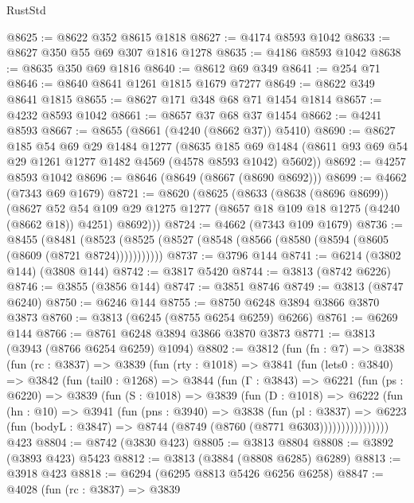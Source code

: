 \begin{lexlean}{RustStd}
\begin{coremodule}
{\begin{coremodule}
{{{{{{{{{{{{{{{{{{{{{{{{{{{{{{{{{{{@8625 := @8622 @352 @8615 @1818
@8627 := @4174 @8593 @1042
@8633 := @8627 @350 @55 @69 @307 @1816 @1278
@8635 := @4186 @8593 @1042
@8638 := @8635 @350 @69 @1816
@8640 := @8612 @69 @349
@8641 := @254 @71
@8646 := @8640 @8641 @1261 @1815 @1679 @7277
@8649 := @8622 @349 @8641 @1815
@8655 := @8627 @171 @348 @68 @71 @1454 @1814
@8657 := @4232 @8593 @1042
@8661 := @8657 @37 @68 @37 @1454
@8662 := @4241 @8593
@8667 := @8655 (@8661 (@4240 (@8662 @37)) @5410)
@8690 := @8627
    @185
    @54
    @69
    @29
    @1484
    @1277
    (@8635 @185 @69 @1484 (@8611 @93 @69 @54 @29 @1261 @1277 @1482 @4569 (@4578 @8593 @1042) @5602))
@8692 := @4257 @8593 @1042
@8696 := @8646 (@8649 (@8667 (@8690 @8692)))
@8699 := @4662 (@7343 @69 @1679)
@8721 := @8620
    (@8625
      (@8633
        (@8638 (@8696 @8699))
        (@8627
          @52
          @54
          @109
          @29
          @1275
          @1277
          (@8657 @18 @109 @18 @1275 (@4240 (@8662 @18)) @4251)
          @8692)))
@8724 := @4662 (@7343 @109 @1679)
@8736 := @8455
    (@8481 (@8523 (@8525 (@8527 (@8548 (@8566 (@8580 (@8594 (@8605 (@8609 (@8721 @8724)))))))))))
@8737 := @3796 @144
@8741 := @6214 (@3802 @144) (@3808 @144)
@8742 := @3817 @5420
@8744 := @3813 (@8742 @6226)
@8746 := @3855 (@3856 @144)
@8747 := @3851 @8746
@8749 := @3813 (@8747 @6240)
@8750 := @6246 @144
@8755 := @8750 @6248 @3894 @3866 @3870 @3873
@8760 := @3813 (@6245 (@8755 @6254 @6259) @6266)
@8761 := @6269 @144
@8766 := @8761 @6248 @3894 @3866 @3870 @3873
@8771 := @3813 (@3943 (@8766 @6254 @6259) @1094)
@8802 := @3812
    (fun (fn : @7) =>
    @3838
      (fun (rc : @3837) =>
      @3839
        (fun (rty : @1018) =>
        @3841
          (fun (lets0 : @3840) =>
          @3842
            (fun (tail0 : @1268) =>
            @3844
              (fun (Γ : @3843) =>
              @6221
                (fun (ps : @6220) =>
                @3839
                  (fun (S : @1018) =>
                  @3839
                    (fun (D : @1018) =>
                    @6222
                      (fun (hn : @10) =>
                      @3941
                        (fun (pns : @3940) =>
                        @3838
                          (fun (pl : @3837) =>
                          @6223
                            (fun (bodyL : @3847) => @8744 (@8749 (@8760 (@8771 @6303))))))))))))))))
    @423
@8804 := @8742 (@3830 @423)
@8805 := @3813 @8804
@8808 := @3892 (@3893 @423) @5423
@8812 := @3813 (@3884 (@8808 @6285) @6289)
@8813 := @3918 @423
@8818 := @6294 (@6295 @8813 @5426 @6256 @6258)
@8847 := @4028
    (fun (rc : @3837) =>
    @3839
}}}}}}}}}}}}}}}}}}}}}}}}}}}}}}}}}}}
\end{coremodule}}
\end{coremodule}
\end{lexlean}
